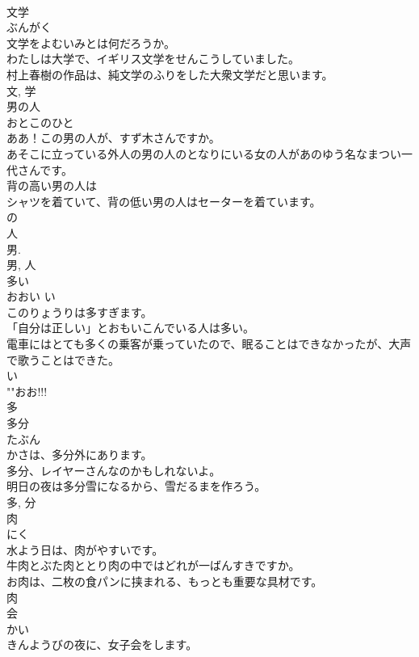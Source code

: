 \documentclass[8pt]{extreport}
\begin{document}
\begin{CJK}{UTF8}{min}
\\	文学	
\\	ぶんがく	
\\	文学をよむいみとは何だろうか。	
\\	わたしは大学で、イギリス文学をせんこうしていました。	
\\	村上春樹の作品は、純文学のふりをした大衆文学だと思います。	
\\	文, 学	
\\	男の人	
\\	おとこのひと	
\\	ああ！この男の人が、すず木さんですか。	
\\	あそこに立っている外人の男の人のとなりにいる女の人があのゆう名なまつい一代さんです。	
\\	背の高い男の人は
\\	シャツを着ていて、背の低い男の人はセーターを着ています。	
\\	の 
\\	人 
\\	男. 
\\	男, 人	
\\	多い	
\\	おおい	い 
\\	このりょうりは多すぎます。	
\\	「自分は正しい」とおもいこんでいる人は多い。	
\\	電車にはとても多くの乗客が乗っていたので、眠ることはできなかったが、大声で歌うことはできた。	
\\	い 
\\	""おお!!!
\\	多	
\\	多分	
\\	たぶん	
\\	かさは、多分外にあります。	
\\	多分、レイヤーさんなのかもしれないよ。	
\\	明日の夜は多分雪になるから、雪だるまを作ろう。	
\\	多, 分	
\\	肉	
\\	にく	
\\	水よう日は、肉がやすいです。	
\\	牛肉とぶた肉ととり肉の中ではどれが一ばんすきですか。	
\\	お肉は、二枚の食パンに挟まれる、もっとも重要な具材です。	
\\	肉	
\\	会	
\\	かい	
\\	きんようびの夜に、女子会をします。	

\end{CJK}
\end{document}
